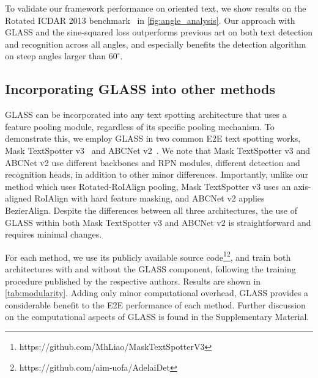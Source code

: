 \documentclass[runningheads]{llncs}
\begin{document}
To validate our framework performance on oriented text, we show results on the Rotated ICDAR 2013 benchmark~\cite{liao2020spotterV3} in \cref{fig:angle_analysis}.
Our approach with GLASS and the sine-squared loss outperforms previous art on both text detection and recognition across all angles, and especially benefits the detection algorithm on steep angles larger than $60^{\circ}$.  

\subsection{Incorporating GLASS into other methods}
\label{sec:modularity}
GLASS can be incorporated into any text spotting architecture that uses a feature pooling module, regardless of its specific pooling mechanism.
To demonstrate this, we employ GLASS in two common E2E text spotting works, Mask TextSpotter v3~\cite{liao2020spotterV3} and ABCNet v2~\cite{liu2021abcnetV2}.
We note that Mask TextSpotter v3 and ABCNet v2 use different backbones and RPN modules, different detection and recognition heads, in addition to other minor differences.
Importantly, unlike our method which uses Rotated-RoIAlign pooling,  Mask TextSpotter v3 uses an axis-aligned RoIAlign with hard feature masking, and ABCNet v2 applies BezierAlign.
Despite the differences between all three architectures, the use of GLASS within 
both Mask TextSpotter v3 and ABCNet v2 is straightforward and requires minimal changes. 

For each method, we use its publicly available source code\footnote{https://github.com/MhLiao/MaskTextSpotterV3}\footnote{https://github.com/aim-uofa/AdelaiDet}, and train both architectures with and without the GLASS component, following the training procedure published by the respective authors.
Results are shown in \cref{tab:modularity}.
Adding only minor computational overhead, GLASS provides a considerable benefit to the E2E performance of each method.
Further discussion on the computational aspects of GLASS is found in the Supplementary Material.
\end{document}
